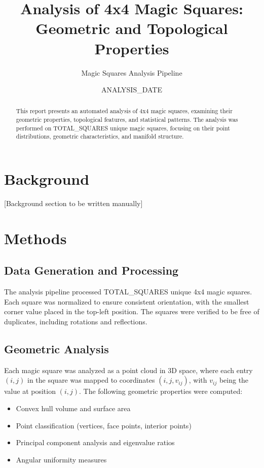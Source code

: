 \documentclass[11pt]{article}
\title{Analysis of 4x4 Magic Squares:\\
Geometric and Topological Properties}
\author{Magic Squares Analysis Pipeline}
\date{ANALYSIS_DATE}
\begin{document}
\maketitle

\begin{abstract}
This report presents an automated analysis of 4x4 magic squares, examining their geometric properties, 
topological features, and statistical patterns. The analysis was performed on TOTAL_SQUARES unique magic squares,
focusing on their point distributions, geometric characteristics, and manifold structure.
\end{abstract}

\section{Background}
\label{sec:background}
[Background section to be written manually]

\section{Methods}
\label{sec:methods}

\subsection{Data Generation and Processing}
The analysis pipeline processed TOTAL_SQUARES unique 4x4 magic squares. Each square was normalized 
to ensure consistent orientation, with the smallest corner value placed in the top-left position.
The squares were verified to be free of duplicates, including rotations and reflections.

\subsection{Geometric Analysis}
Each magic square was analyzed as a point cloud in 3D space, where each entry $(i,j)$ in the square
was mapped to coordinates $(i, j, v_{ij})$, with $v_{ij}$ being the value at position $(i,j)$.
The following geometric properties were computed:
\begin{itemize}
    \item Convex hull volume and surface area
    \item Point classification (vertices, face points, interior points)
    \item Principal component analysis and eigenvalue ratios
    \item Angular uniformity measures
\end{itemize}
\end{document}
